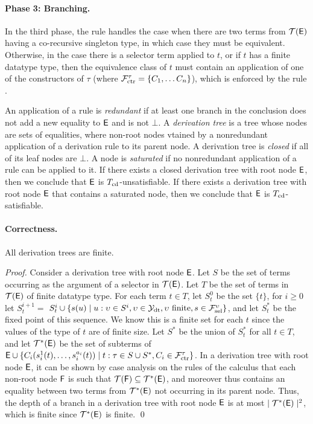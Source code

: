 \paragraph{Phase 3: Branching.}
In the third phase,
the  rule handles the case when there are two terms from $\mathcal{T}(\mathsf{E})$
having a co-recursive singleton type, in which case they must be equivalent.
Otherwise, in the case there is a selector term applied to $t$, or if $t$ has a finite datatype type, 
then the equivalence class of $t$ must contain an application of one of the constructors of $\tau$ (where $\mathcal{F}_{\mathrm{ctr}}^\tau = \{ C_1, \ldots C_n \}$), 
which is enforced by the rule .

An application of a rule is \emph{redundant} if at least one branch in the
conclusion does not add a new equality to $\mathsf{E}$ and is not $\bot$.
A \emph{derivation tree} is a tree whose nodes are sets of equalities, where non-root nodes vtained by 
a nonredundant application of a derivation rule to its parent node.
A derivation tree is \emph{closed} if all of its leaf nodes are $\bot$.
A node is \emph{saturated} if no nonredundant application of a rule can be applied to it.
If there exists a closed derivation tree with root node $\mathsf{E}$, then we conclude that $\mathsf{E}$ is $T_{\mathrm{cd}}$-unsatisfiable.
If there exists a derivation tree with root node $\mathsf{E}$ that contains a saturated node, then we conclude that $\mathsf{E}$ is $T_{\mathrm{cd}}$-satisfiable. 

\paragraph{Correctness.}

\begin{lemma}[Termination]%
\label{lem:t}%
\afterDot
All derivation trees are finite.
\end{lemma}
\begin{proof}
Consider a derivation tree with root node $\mathsf{E}$.
Let $S$ be the set of terms occurring as the argument of a selector in $\mathcal{T}(\mathsf{E})$.
Let $T$ be the set of terms in $\mathcal{T}(\mathsf{E})$ of finite datatype type.
For each term $t \in T$,
let $S^0_t$ be the set $\{ t \}$,
for $i \geq 0$ let $S^{i+1}_t =$ $S^i_t \cup \{ s( u ) \mid u : \upsilon \in S^i, \upsilon \in \mathcal{Y}_{\mathrm{dt}}, \upsilon \text{ finite}, s \in \mathcal{F}_{\mathrm{sel}}^{\upsilon}  \}$,
and let $S^\ast_t$ be the fixed point of this sequence.
We know this is a finite set for each $t$ since the values of the type of $t$ are of finite size.
Let $S^\ast$ be the union of $S^\ast_t$ for all $t \in T$,
and let $\mathcal{T}^\ast(\mathsf{E})$ be the set of subterms of $\mathsf{E} \cup \{ C_i( s^1_i( t ), \ldots, s^{a_i}_i( t ) ) \mid t : \tau \in S \cup S^\ast, C_i \in \mathcal{F}_{\mathrm{ctr}}^\tau \}$.
In a derivation tree with root node $\mathsf{E}$, 
it can be shown by case analysis on the rules of the calculus that each non-root node $\mathsf{F}$ is such that 
$\mathcal{T}(\mathsf{F}) \subseteq \mathcal{T}^\ast(\mathsf{E})$, and moreover thus contains an equality between two terms from $\mathcal{T}^\ast(\mathsf{E})$ not occurring in its parent node.
Thus, the depth of a branch in a derivation tree with root node $\mathsf{E}$ is at most $\mid \mathcal{T}^\ast(\mathsf{E}) \mid^2$,
which is finite since $\mathcal{T}^\ast(\mathsf{E})$ is finite.
\qed
\end{proof}


